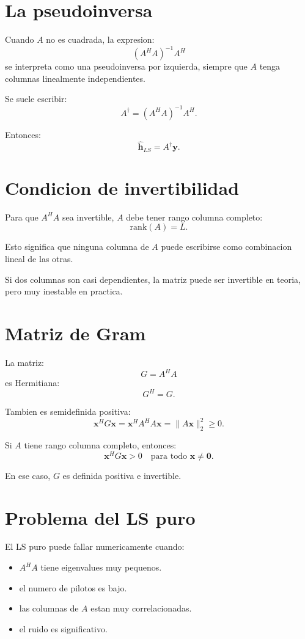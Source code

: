 \documentclass[11pt]{article}
\begin{document}
\section{La pseudoinversa}

Cuando \(A\) no es cuadrada, la expresion:
\[
    (A^H A)^{-1}A^H
\]
se interpreta como una pseudoinversa por izquierda, siempre que \(A\) tenga
columnas linealmente independientes.

Se suele escribir:
\[
    A^\dagger = (A^H A)^{-1}A^H.
\]

Entonces:
\[
    \hat{\bm h}_{LS} = A^\dagger \bm y.
\]

\section{Condicion de invertibilidad}

Para que \(A^H A\) sea invertible, \(A\) debe tener rango columna completo:
\[
    \mathrm{rank}(A) = L.
\]

Esto significa que ninguna columna de \(A\) puede escribirse como combinacion
lineal de las otras.

Si dos columnas son casi dependientes, la matriz puede ser invertible en teoria,
pero muy inestable en practica.

\section{Matriz de Gram}

La matriz:
\[
    G = A^H A
\]
es Hermitiana:
\[
    G^H = G.
\]

Tambien es semidefinida positiva:
\[
    \bm x^H G \bm x
    =
    \bm x^H A^H A \bm x
    =
    \|A\bm x\|_2^2
    \ge 0.
\]

Si \(A\) tiene rango columna completo, entonces:
\[
    \bm x^H G\bm x > 0
    \quad
    \text{para todo }
    \bm x \ne \bm 0.
\]

En ese caso, \(G\) es definida positiva e invertible.

\section{Problema del LS puro}

El LS puro puede fallar numericamente cuando:

\begin{itemize}
    \item \(A^H A\) tiene eigenvalues muy pequenos.
    \item el numero de pilotos es bajo.
    \item las columnas de \(A\) estan muy correlacionadas.
    \item el ruido es significativo.
\end{itemize}
\end{document}
